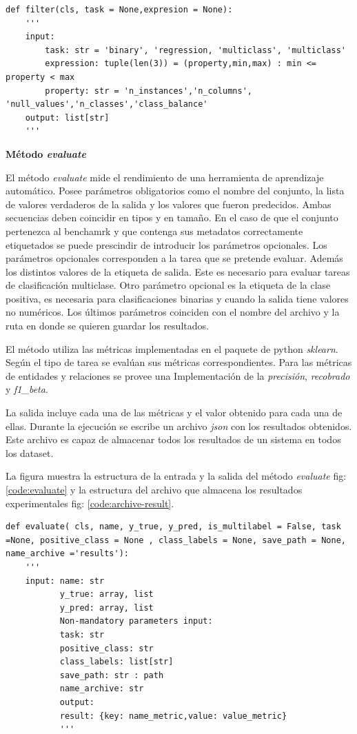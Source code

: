 \begin{lstlisting}[caption=Método filter, label= code:filter]
def filter(cls, task = None,expresion = None):
    '''
    input:
        task: str = 'binary', 'regression, 'multiclass', 'multiclass'
        expression: tuple(len(3)) = (property,min,max) : min <= property < max
        property: str = 'n_instances','n_columns', 'null_values','n_classes','class_balance'
    output: list[str]
    '''  
\end{lstlisting}

\begin{flushleft} 
    { \textbf{Método \textit{evaluate}}}\label{method:mevaluate}
\end{flushleft}
El método \textit{evaluate} mide el rendimiento de una herramienta de aprendizaje automático. 
Posee parámetros obligatorios como el nombre del conjunto, la lista de valores verdaderos de la salida y los valores que fueron predecidos.
Ambas secuencias deben coincidir en tipos y en tamaño. En el caso de que el conjunto pertenezca al benchamrk y que contenga sus metadatos 
correctamente etiquetados se puede prescindir de introducir los parámetros opcionales. 
Los parámetros opcionales corresponden a la tarea que se pretende evaluar. Además los distintos valores de la etiqueta de salida. Este es necesario para evaluar 
tareas de clasificación multiclase. Otro parámetro opcional es la etiqueta de la clase positiva, es necesaria para clasificaciones binarias y cuando la salida tiene 
valores no numéricos. 
Los últimos parámetros coinciden con el nombre del archivo y la ruta en donde se quieren guardar los resultados. 

El método utiliza las métricas implementadas en el paquete de python \textit{sklearn}. Según el tipo de tarea se evalúan sus métricas correspondientes.
Para las métricas de entidades y relaciones se provee una Implementación de la \textit{precisión}, \textit{recobrado} y \textit{f1\_beta}. 

La salida incluye cada una de las métricas y el valor obtenido para cada una de ellas. Durante la ejecución se escribe un archivo \textit{json} con los resultados 
obtenidos. Este archivo es capaz de almacenar todos los resultados de un sistema en todos los dataset.

La figura muestra la estructura de la entrada y la salida del método \textit{evaluate} fig:\ref{code:evaluate} y la estructura del archivo que almacena los resultados 
experimentales fig: \ref{code:archive-result}.


\begin{lstlisting}[caption=Método evaluate, label= code:evaluate]
    def evaluate( cls, name, y_true, y_pred, is_multilabel = False, task =None, positive_class = None , class_labels = None, save_path = None, name_archive ='results'):
    '''
    input: name: str
           y_true: array, list
           y_pred: array, list
           Non-mandatory parameters input:
           task: str
           positive_class: str
           class_labels: list[str]
           save_path: str : path
           name_archive: str
           output: 
           result: {key: name_metric,value: value_metric}
           '''
        \end{lstlisting}
        
